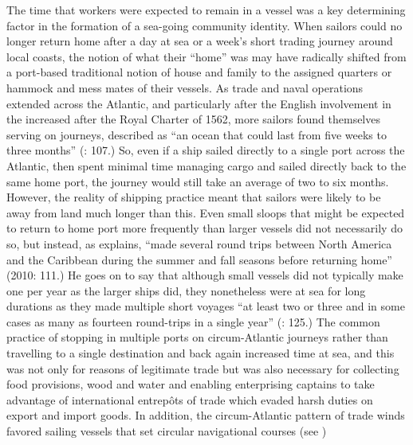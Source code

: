The time that workers were expected to remain in a vessel was a key determining factor in the formation of a sea-going community identity. When sailors could no longer return home after a day at sea or a week’s short trading journey around local coasts, the notion of what their “home” was may have radically shifted from a port-based traditional notion of house and family to the assigned quarters or hammock and mess mates of their vessels. As trade and naval operations extended across the Atlantic, and particularly after the English involvement in the  increased after the Royal Charter of 1562, more sailors found themselves serving on  journeys, described as “an ocean  that could last from five weeks to three months” (\citealt{Brown2011}: 107.) So, even if a ship sailed directly to a single port across the Atlantic, then spent minimal time managing cargo and sailed directly back to the same home port, the journey would still take an average of two to six months. However, the reality of shipping practice meant that sailors were likely to be away from land much longer than this. Even small sloops that might be expected to return to home port more frequently than larger vessels did not necessarily do so, but instead, as \citeauthor{Jarvis2010} explains, “made several round trips between North America and the Caribbean during the summer and fall seasons before returning home” (2010: 111.)  He goes on to say that although small vessels did not typically make one   per year as the larger ships did, they nonetheless were at sea for long durations as they made multiple short voyages “at least two or three and in some cases as many as fourteen round-trips in a single year” (\citealt{Jarvis2010}: 125.) The common practice of stopping in multiple ports on circum-Atlantic journeys rather than travelling to a single destination and back again increased time at sea, and this was not only for reasons of legitimate trade but was also necessary for collecting food provisions, wood and water and enabling enterprising captains to take advantage of international entrepôts of trade which evaded harsh duties on export and import goods. In addition, the circum-Atlantic pattern of trade winds favored sailing vessels that set circular navigational courses (see ) 


